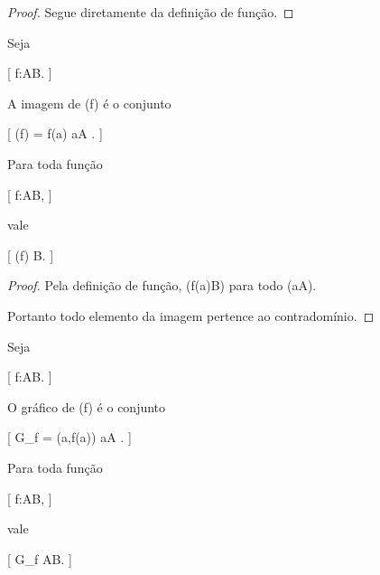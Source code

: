 \documentclass[../../main]{subfiles}
\begin{document}
\begin{proof}

	Segue diretamente da definição de função.

\end{proof}

\begin{defn}
	\label{def:matematica:funcoes:fundamentos:imagem}

	Seja

		[
			f:A\to B.
		]

	A imagem de (f) é o conjunto

		[
			(f)
				=
				{
					f(a)
					\mid
					a\in A
				}.
		]

\end{defn}

\begin{prop}
	\label{prop:matematica:funcoes:fundamentos:imagem-subconjunto}

	Para toda função

	[
	f:A\to B,
	]

	vale

		[
			(f)
			\subseteq
			B.
		]

\end{prop}

\begin{proof}

	Pela definição de função,
	(f(a)\in B) para todo (a\in A).

	Portanto todo elemento da imagem pertence ao
	contradomínio.

\end{proof}

\begin{defn}
	\label{def:matematica:funcoes:fundamentos:grafico}

	Seja

		[
			f:A\to B.
		]

	O gráfico de (f) é o conjunto

		[
			G_f
				=
				{
					(a,f(a))
					\mid
					a\in A
				}.
		]

\end{defn}

\begin{prop}
	\label{prop:matematica:funcoes:fundamentos:grafico-subconjunto}

	Para toda função

	[
	f:A\to B,
	]

	vale

		[
			G_f
			\subseteq
			A\times B.
		]

\end{prop}
\end{document}
